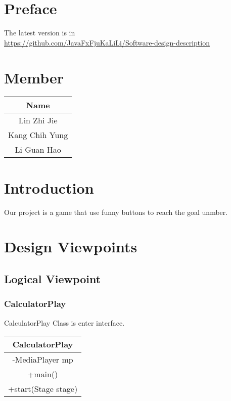 \section{Preface}
The latest version is in\\ \url{https://github.com/JavaFxFjuKaLiLi/Software-design-description}

\tableofcontents

\section{Member}
\begin{center}\begin{tabular}{ |c| } \hline Name \\ \hline Lin Zhi Jie \\ \hline Kang Chih Yung \\ \hline Li Guan Hao \\ \hline \end{tabular}\end{center}

\section{Introduction}
Our project is a game that use funny buttons to reach the goal unmber.
\section{Design Viewpoints}

\subsection{Logical Viewpoint}

\subsubsection{CalculatorPlay}
CalculatorPlay Class is enter interface.
\begin{center}\begin{tabular}{ |c| } \hline CalculatorPlay \\ \hline -MediaPlayer mp \\ \hline +main() \\ +start(Stage stage) \\ \hline \end{tabular}\end{center}

